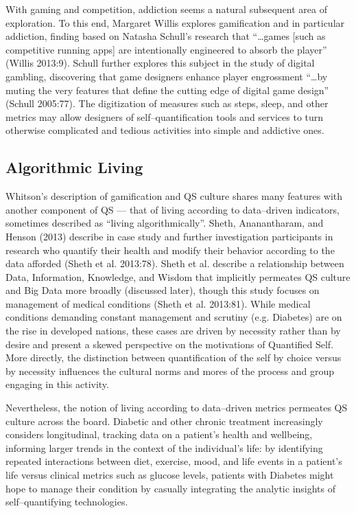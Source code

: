 \documentclass{article}
\begin{document}
With gaming and competition,
addiction seems a natural subsequent area of exploration.
To this end,
Margaret Willis explores gamification and in particular addiction,
finding based on Natasha Schull's research that ``\dots games [such as competitive running apps] are intentionally engineered to absorb the player''
(Willis 2013:9). 
Schull further explores this subject in the study of digital gambling,
discovering that game designers enhance player engrossment ``\dots by muting the very features that define the cutting edge of digital game design''
(Schull 2005:77). 
The digitization of measures such as steps,
sleep,
and other metrics may allow designers of self--quantification tools and services to turn otherwise complicated and tedious activities into simple and addictive ones.

\subsection*{Algorithmic Living}
Whitson's description of gamification and QS culture shares many features with another component of QS
--- that of living according to data--driven indicators,
sometimes described as ``living algorithmically''.
Sheth,
Ananantharam,
and Henson (2013) describe in case study and further investigation participants in research who quantify their health and modify  their behavior according to the data afforded
(Sheth et al. 2013:78). 
Sheth et al.
describe a relationship between Data,
Information,
Knowledge,
and Wisdom that implicitly permeates QS culture and Big Data more broadly (discussed later), 
though this study focuses on management of medical conditions
(Sheth et al. 2013:81). 
While medical conditions demanding constant management and scrutiny (e.g.
Diabetes) are on the rise in developed nations,
these cases are driven by necessity rather than by desire and present a skewed perspective on the motivations of Quantified Self.
More directly,
the distinction between quantification of the self by choice versus by necessity influences the cultural norms and mores of the process and group engaging in this activity.

Nevertheless,
the notion of living according to data--driven metrics permeates QS culture across the board.
Diabetic and other chronic treatment increasingly considers longitudinal,
tracking data on a patient's health and wellbeing,
informing larger trends in the context of the individual's life:
by identifying repeated interactions between diet,
exercise,
mood,
and life events in a patient's life versus clinical metrics such as glucose levels,
patients with Diabetes might hope to manage their condition by casually integrating the analytic insights of self--quantifying technologies.
\end{document}
